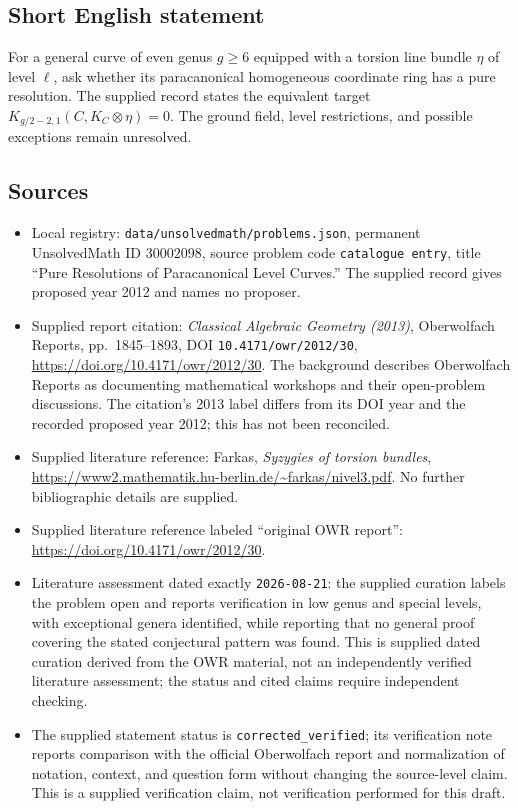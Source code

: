 \documentclass[11pt]{article}
\begin{document}
\subsection{Short English statement}
For a general curve of even genus $g\geq6$ equipped with a torsion line bundle $\eta$ of level $\ell$, ask whether its paracanonical homogeneous coordinate ring has a pure resolution. The supplied record states the equivalent target $K_{g/2-2,1}(C,K_C\otimes\eta)=0$. The ground field, level restrictions, and possible exceptions remain unresolved.
\subsection{Sources}
\begin{itemize}
\item Local registry: \texttt{data/unsolvedmath/problems.json}, permanent UnsolvedMath ID $30002098$, source problem code \texttt{catalogue entry}, title ``Pure Resolutions of Paracanonical Level Curves.'' The supplied record gives proposed year 2012 and names no proposer.
\item Supplied report citation: \emph{Classical Algebraic Geometry (2013)}, Oberwolfach Reports, pp.~1845--1893, DOI \texttt{10.4171/owr/2012/30}, \url{https://doi.org/10.4171/owr/2012/30}. The background describes Oberwolfach Reports as documenting mathematical workshops and their open-problem discussions. The citation's 2013 label differs from its DOI year and the recorded proposed year 2012; this has not been reconciled.
\item Supplied literature reference: Farkas, \emph{Syzygies of torsion bundles}, \url{https://www2.mathematik.hu-berlin.de/~farkas/nivel3.pdf}. No further bibliographic details are supplied.
\item Supplied literature reference labeled ``original OWR report'': \url{https://doi.org/10.4171/owr/2012/30}.
\item Literature assessment dated exactly \texttt{2026-08-21}: the supplied curation labels the problem open and reports verification in low genus and special levels, with exceptional genera identified, while reporting that no general proof covering the stated conjectural pattern was found. This is supplied dated curation derived from the OWR material, not an independently verified literature assessment; the status and cited claims require independent checking.
\item The supplied statement status is \texttt{corrected\_verified}; its verification note reports comparison with the official Oberwolfach report and normalization of notation, context, and question form without changing the source-level claim. This is a supplied verification claim, not verification performed for this draft.
\end{itemize}
\end{document}
